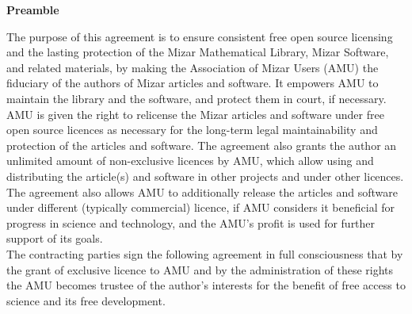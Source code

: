 
\begin{center}
{\Large\bf Preamble}
\end{center}

The purpose of this agreement is to ensure consistent free open source
licensing and the lasting protection of the Mizar Mathematical
Library, Mizar Software,
and related materials, by making the
Association of Mizar Users (AMU) the fiduciary of the authors of
Mizar articles and software.  It empowers AMU to maintain the library
and the software, and protect
them in court, if necessary.\\

AMU is given the right to relicense the Mizar articles and software under free open
source licences as necessary for the long-term legal maintainability
and protection of the articles and software. The agreement also grants the author
an unlimited amount of non-exclusive licences by AMU, which allow
using and distributing the article(s) and software in
other projects and under other licences. \\

The agreement also allows AMU to
additionally release the articles and software under different (typically
commercial) licence, if AMU considers it beneficial for progress in
science and technology, and the AMU's profit is used for further support
of its goals.\\

The contracting parties sign the following agreement in full
consciousness that by the grant of exclusive licence to AMU and by the
administration of these rights the AMU becomes trustee of the author's
interests for the benefit of free access to science and its free development.\\



 

